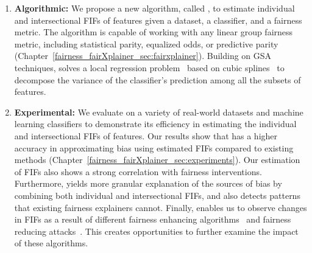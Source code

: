 \begin{enumerate}
	\item \textbf{Algorithmic:} We propose a new algorithm, called {\fairXplainer}, to estimate individual and intersectional FIFs of features given a dataset, a classifier, and a fairness metric. The algorithm is capable of working with any linear group fairness metric, including statistical parity, equalized odds, or predictive parity (Chapter~\ref{fairness_fairXplainer_sec:fairxplainer}). Building on GSA\cite{saltelli2008global} techniques, {\fairXplainer} solves a local regression problem~\cite{loader2006local} based on cubic splines~\cite{li2010global} to decompose the variance of the classifier's prediction among all the subsets of features.
	
	
	\item \textbf{Experimental:} We evaluate  {\fairXplainer}  on a variety of real-world datasets and machine learning classifiers to demonstrate its efficiency in estimating the individual and intersectional FIFs of features. Our results show that {\fairXplainer} has a higher accuracy in approximating bias using estimated FIFs compared to existing methods (Chapter~\ref{fairness_fairXplainer_sec:experiments}). Our estimation of FIFs also shows a strong correlation with fairness interventions. Furthermore, {\fairXplainer} yields more granular explanation of the sources of bias by combining both individual and intersectional FIFs, and also detects patterns that existing fairness explainers cannot. Finally, {\fairXplainer} enables us to observe changes in FIFs as a result of different fairness enhancing algorithms~\cite{calmon2017optimized,hardt2016equality,kamiran2012decision,zemel2013learning,zhang2018mitigating,zhang2018fairness,zhang2019faht} and fairness reducing attacks~\cite{hua2021human,mehrabi2020exacerbating,solans2020poisoning}. This creates opportunities to further examine the impact of these algorithms.	
\end{enumerate}




